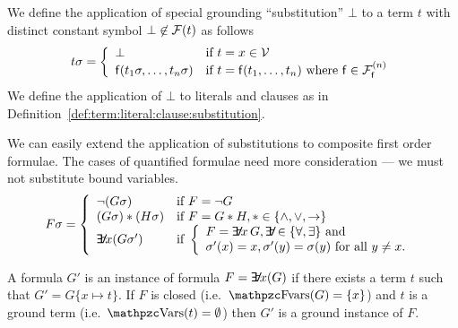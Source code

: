 \begin{definition}\label{def:term:literal:clause:substitution}
	We define the application of special grounding “substitution” \( \bot \) to a term \( t \) with distinct constant symbol \( \bot \not\in\mcF(t) \)
	as follows
	\begin{gather*}
	\MDEFINE{t\sigma}{ll}{
			\bot & \text{if }t=x\in\mcV
			\\
			\mf(t_1\sigma,\ldots,t_n\sigma)	&\text{if }t=\mf(t_1,\ldots,t_n)
			\text{ where  }
			 \mf\in\mcFfn
			 }
	\end{gather*}
	We define the application of \( \bot \) to literals and clauses as in
	Definition~\vref{def:term:literal:clause:substitution}.

\end{definition}

\begin{definition}
	We can easily extend the application of substitutions
	to composite first order formulae.
	The cases of quantified formulae need more consideration ---
	we must not substitute bound variables.
	\begin{gather*}
	\MDEFINE{F\sigma}{ll}{
		\lnot(G\sigma) & \text{if }F = \lnot G
		\\
		(G\sigma) * (H\sigma) & \text{if }F = G * H, *\in \{ \land, \lor, \limp \}
		\\
		\quantify x (G\sigma')
		&
		\text{if }
		\left\{  %
			\begin{array}{l}
				F = \quantify x\,G,
				\quantify \in \{ \forall, \exists \}
				\text{ and}
				\\
				\sigma'(x) = x, \sigma'(y) = \sigma(y)
				\text{ for all } y \neq x.
		\end{array}
		\right.
	}
	\end{gather*}
\end{definition}

\begin{definition}
	A formula \( G' \) is an instance of formula \( F = \quantify x (G) \)
	if there exists a term \( t \) such that \( G' = G\{ x\mapsto t \} \).
	If \( F \) is closed (i.e.\ \( \fvar(G) = \{ x \} \)) %
	and \( t \) is a ground term (i.e.\ \( \var(t) = \emptyset \)) then %
	\( G' \) is a ground instance of \( F \).
\end{definition}

